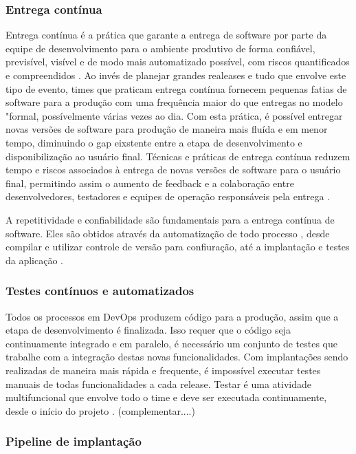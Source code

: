 \documentclass[twoside,english,brazilian]{UNISINOSartigo}
\begin{document}
\subsubsection{Entrega contínua}
Entrega contínua é a prática que garante a entrega de software por parte da equipe de desenvolvimento para o ambiente produtivo de forma confiável, previsível, visível e de modo mais automatizado possível, com riscos quantificados e compreendidos \cite{Humble2012}.  Ao invés de planejar grandes realeases e tudo que envolve este tipo de evento, times que praticam entrega contínua fornecem pequenas fatias de software para a produção com uma frequência maior do que entregas no modelo "formal, possívelmente várias vezes ao dia. Com esta prática, é possível entregar novas versões de software para produção de maneira mais fluída e em menor tempo, diminuindo o gap eixstente entre a etapa de desenvolvimento e disponibilização ao usuário final. Técnicas e práticas de entrega contínua reduzem tempo e riscos associados à entrega de novas versões de software para o usuário final, permitindo assim o aumento de feedback e a colaboração entre desenvolvedores, testadores e equipes de operação responsáveis pela entrega \cite{Humble2012}. \newline


A repetitividade e confiabilidade são fundamentais para a entrega contínua de software. Eles são obtidos através da automatização de todo processo , desde compilar e utilizar controle de versão para confiuração, até a implantação e testes da aplicação \citep{Humble2012}.
\subsubsection{Testes contínuos e automatizados}
Todos os processos em DevOps produzem código para a produção, assim que a etapa de desenvolvimento é finalizada. Isso requer que o código seja continuamente integrado e em paralelo, é necessário um conjunto de testes que trabalhe com a integração destas novas funcionalidades. Com implantações sendo realizadas de maneira mais rápida e frequente, é impossível executar testes manuais  de todas funcionalidades a cada release. Testar é uma atividade multifuncional que envolve todo o time e deve ser executada continuamente, desde o início do projeto \cite{Humble2012}.  (complementar....)
\subsubsection{Pipeline de implantação}
\end{document}
